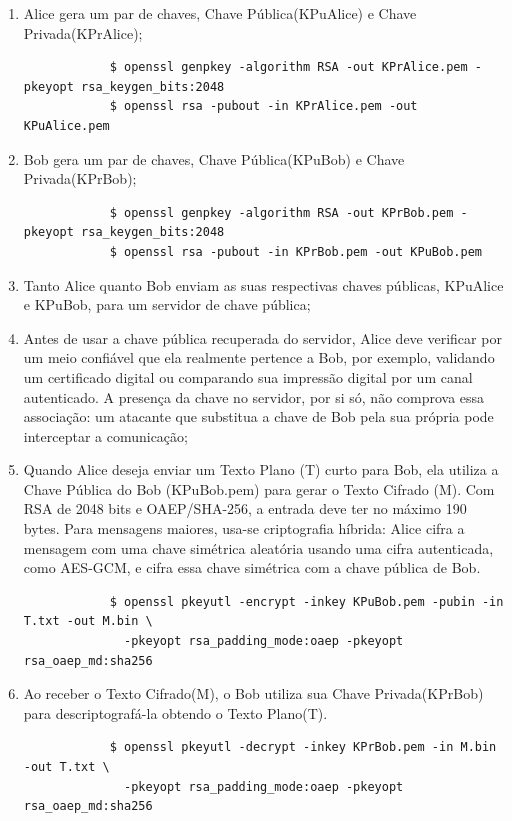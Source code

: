 \begin{enumerate}
	\item Alice gera um par de chaves, Chave Pública(KPuAlice) e Chave Privada(KPrAlice);
	\begin{tcolorbox}[width=\textwidth]
		{\normalsize
			\begin{verbatim}
			$ openssl genpkey -algorithm RSA -out KPrAlice.pem -pkeyopt rsa_keygen_bits:2048
			$ openssl rsa -pubout -in KPrAlice.pem -out KPuAlice.pem
			\end{verbatim}
		}
	\end{tcolorbox}
	\item Bob gera um par de chaves, Chave Pública(KPuBob) e Chave Privada(KPrBob);
	\begin{tcolorbox}[width=\textwidth]
		{\normalsize
			\begin{verbatim}
			$ openssl genpkey -algorithm RSA -out KPrBob.pem -pkeyopt rsa_keygen_bits:2048
			$ openssl rsa -pubout -in KPrBob.pem -out KPuBob.pem
			\end{verbatim}
		}
	\end{tcolorbox}
	\item Tanto Alice quanto Bob enviam as suas respectivas chaves públicas, KPuAlice e KPuBob, para um servidor de chave pública;
	\item Antes de usar a chave pública recuperada do servidor, Alice deve verificar por um meio confiável que ela realmente pertence a Bob, por exemplo, validando um certificado digital ou comparando sua impressão digital por um canal autenticado. A presença da chave no servidor, por si só, não comprova essa associação: um atacante que substitua a chave de Bob pela sua própria pode interceptar a comunicação;
	\item Quando Alice deseja enviar um Texto Plano (T) curto para Bob, ela utiliza a Chave Pública do Bob (KPuBob.pem) para gerar o Texto Cifrado (M). Com RSA de 2048 bits e OAEP/SHA-256, a entrada deve ter no máximo 190 bytes. Para mensagens maiores, usa-se criptografia híbrida: Alice cifra a mensagem com uma chave simétrica aleatória usando uma cifra autenticada, como AES-GCM, e cifra essa chave simétrica com a chave pública de Bob.
	\begin{tcolorbox}[width=\textwidth]
		{\normalsize
			\begin{verbatim}
			$ openssl pkeyutl -encrypt -inkey KPuBob.pem -pubin -in T.txt -out M.bin \
			  -pkeyopt rsa_padding_mode:oaep -pkeyopt rsa_oaep_md:sha256
			\end{verbatim}
		}
	\end{tcolorbox}
	\item Ao receber o Texto Cifrado(M), o Bob utiliza sua Chave Privada(KPrBob) para descriptografá-la obtendo o Texto Plano(T).
	\begin{tcolorbox}[width=\textwidth]
		{\normalsize
			\begin{verbatim}
			$ openssl pkeyutl -decrypt -inkey KPrBob.pem -in M.bin -out T.txt \
			  -pkeyopt rsa_padding_mode:oaep -pkeyopt rsa_oaep_md:sha256
			\end{verbatim}
		}
	\end{tcolorbox}
\end{enumerate}

